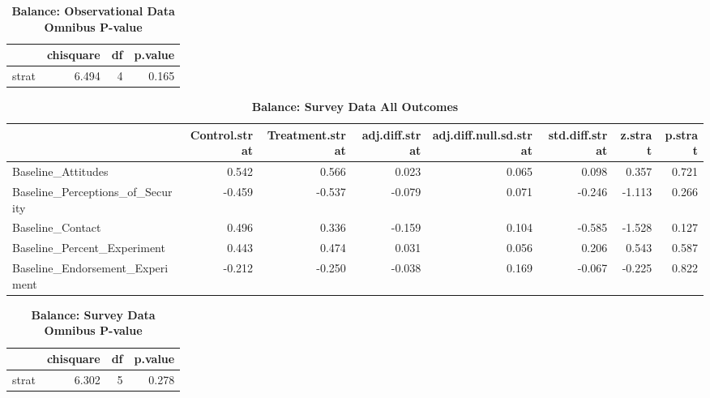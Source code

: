 \documentclass[
]{article}
\begin{document}
\begin{table}[H]
\begin{center}
\label{tab:bal_obs_tab2}
\caption{\textbf{Balance: Observational Data Omnibus P-value}}
\smallskip

\begin{tabular}{l|r|r|r}
\hline
  & chisquare & df & p.value\\
\hline
strat & 6.494 & 4 & 0.165\\
\hline
\end{tabular}


\end{center}
\end{table}

\begin{table}[H]
\begin{center}
\label{tab:bal_svy_tab1}
\caption{\textbf{Balance: Survey Data All Outcomes}}
\smallskip

\begin{tabular}{l|r|r|r|r|r|r|r}
\hline
  & Control.strat & Treatment.strat & adj.diff.strat & adj.diff.null.sd.strat & std.diff.strat & z.strat & p.strat\\
\hline
Baseline\_Attitudes & 0.542 & 0.566 & 0.023 & 0.065 & 0.098 & 0.357 & 0.721\\
\hline
Baseline\_Perceptions\_of\_Security & -0.459 & -0.537 & -0.079 & 0.071 & -0.246 & -1.113 & 0.266\\
\hline
Baseline\_Contact & 0.496 & 0.336 & -0.159 & 0.104 & -0.585 & -1.528 & 0.127\\
\hline
Baseline\_Percent\_Experiment & 0.443 & 0.474 & 0.031 & 0.056 & 0.206 & 0.543 & 0.587\\
\hline
Baseline\_Endorsement\_Experiment & -0.212 & -0.250 & -0.038 & 0.169 & -0.067 & -0.225 & 0.822\\
\hline
\end{tabular}


\end{center}
\end{table}

\begin{table}[H]
\begin{center}
\label{tab:bal_svy_tab2}
\caption{\textbf{Balance: Survey Data Omnibus P-value}}
\smallskip

\begin{tabular}{l|r|r|r}
\hline
  & chisquare & df & p.value\\
\hline
strat & 6.302 & 5 & 0.278\\
\hline
\end{tabular}


\end{center}
\end{table}
\end{document}
